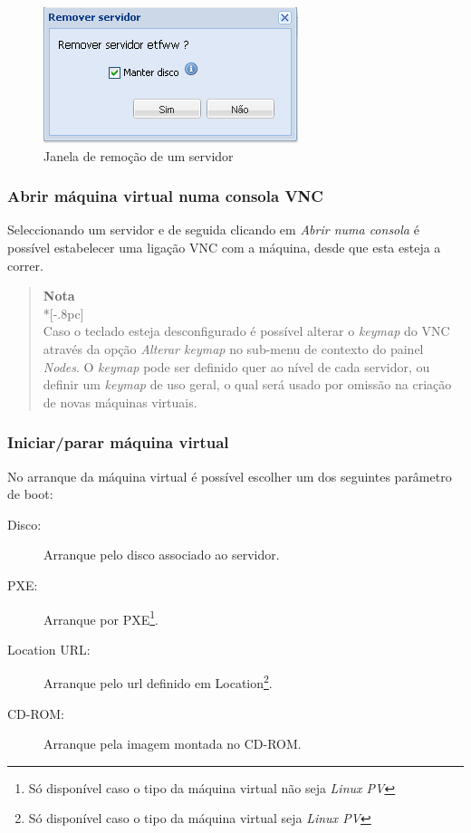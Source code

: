 \begin{figure}[H]
	\begin{center}
	\includegraphics[scale=0.5]{screenshots/server_remove.png}
	\caption{Janela de remoção de um servidor}
	\label{fig:server_remove}
	\end{center}
\end{figure}

\subsubsection{Abrir máquina virtual numa consola VNC}
\label{sec:open_vnc}

Seleccionando um servidor e de seguida clicando em \emph{Abrir numa consola} é possível estabelecer uma ligação VNC com a máquina, desde que esta esteja a correr.

\begin{quote}
	{\large \bf Nota} \\*[-.8pc]
	\underline{\hspace{6in}} \\
	Caso o teclado esteja desconfigurado é possível alterar o \emph{keymap} do VNC através da opção \emph{Alterar keymap} no sub-menu de contexto do painel \emph{Nodes}.
    O \emph{keymap} pode ser definido quer ao nível de cada servidor, ou definir um \emph{keymap} de uso geral, o qual será usado por omissão na criação de novas máquinas virtuais.
\end{quote}

\subsubsection{Iniciar/parar máquina virtual}
\label{sec:start_server}

No arranque da máquina virtual é possível escolher um dos seguintes parâmetro de boot:
\begin{description}
	\item[Disco:] Arranque pelo disco associado ao servidor.
    \item[PXE:] Arranque por PXE\footnote{Só disponível caso o tipo da máquina virtual não seja \emph{Linux PV}\label{foot:notpv}}.
    \item[Location URL:] Arranque pelo url definido em Location\footnote{Só disponível caso o tipo da máquina virtual seja \emph{Linux PV}}.
	\item[CD-ROM:] Arranque pela imagem montada no CD-ROM.
    	 
\end{description}

